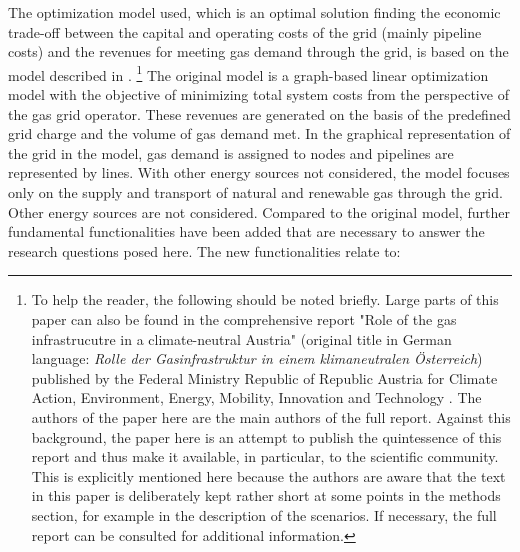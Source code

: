 The optimization model used, which is an optimal solution finding the economic trade-off between the capital and operating costs of the grid (mainly pipeline costs) and the revenues for meeting gas demand through the grid, is based on the model described in \cite{zwickl2023design}. \footnote{To help the reader, the following should be noted briefly. Large parts of this paper can also be found in the comprehensive report "Role of the gas infrastrucutre in a climate-neutral Austria" (original title in German language: \textit{Rolle der Gasinfrastruktur in einem klimaneutralen Österreich}) published by the Federal Ministry Republic of Republic Austria for Climate Action, Environment, Energy, Mobility, Innovation and Technology \cite{frontier2023}. The authors of the paper here are the main authors of the full report. Against this background, the paper here is an attempt to publish the quintessence of this report and thus make it available, in particular, to the scientific community. This is explicitly mentioned here because the authors are aware that the text in this paper is deliberately kept rather short at some points in the methods section, for example in the description of the scenarios. If necessary, the full report can be consulted for additional information.} The original model is a graph-based linear optimization model with the objective of minimizing total system costs from the perspective of the gas grid operator. These revenues are generated on the basis of the predefined grid charge and the volume of gas demand met. In the graphical representation of the grid in the model, gas demand is assigned to nodes and pipelines are represented by lines. With other energy sources not considered, the model focuses only on the supply and transport of natural and renewable gas through the grid. Other energy sources are not considered. Compared to the original model, further fundamental functionalities have been added that are necessary to answer the research questions posed here. The new functionalities relate to:

